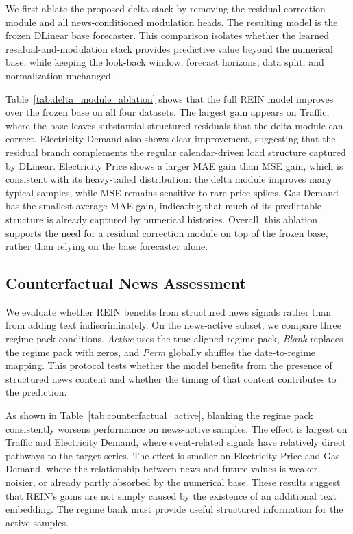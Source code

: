 \documentclass{article}
\begin{document}
We first ablate the proposed delta stack by removing the residual correction module and all news-conditioned modulation heads. The resulting model is the frozen DLinear base forecaster. This comparison isolates whether the learned residual-and-modulation stack provides predictive value beyond the numerical base, while keeping the look-back window, forecast horizons, data split, and normalization unchanged.

Table~\ref{tab:delta_module_ablation} shows that the full REIN model improves over the frozen base on all four datasets. The largest gain appears on Traffic, where the base leaves substantial structured residuals that the delta module can correct. Electricity Demand also shows clear improvement, suggesting that the residual branch complements the regular calendar-driven load structure captured by DLinear. Electricity Price shows a larger MAE gain than MSE gain, which is consistent with its heavy-tailed distribution: the delta module improves many typical samples, while MSE remains sensitive to rare price spikes. Gas Demand has the smallest average MAE gain, indicating that much of its predictable structure is already captured by numerical histories. Overall, this ablation supports the need for a residual correction module on top of the frozen base, rather than relying on the base forecaster alone.

\subsection{Counterfactual News Assessment}
\label{sec:ablation_news}

We evaluate whether REIN benefits from structured news signals rather than from adding text indiscriminately. On the news-active subset, we compare three regime-pack conditions. \textit{Active} uses the true aligned regime pack, \textit{Blank} replaces the regime pack with zeros, and \textit{Perm} globally shuffles the date-to-regime mapping. This protocol tests whether the model benefits from the presence of structured news content and whether the timing of that content contributes to the prediction.

As shown in Table~\ref{tab:counterfactual_active}, blanking the regime pack consistently worsens performance on news-active samples. The effect is largest on Traffic and Electricity Demand, where event-related signals have relatively direct pathways to the target series. The effect is smaller on Electricity Price and Gas Demand, where the relationship between news and future values is weaker, noisier, or already partly absorbed by the numerical base. These results suggest that REIN's gains are not simply caused by the existence of an additional text embedding. The regime bank must provide useful structured information for the active samples.
\end{document}

